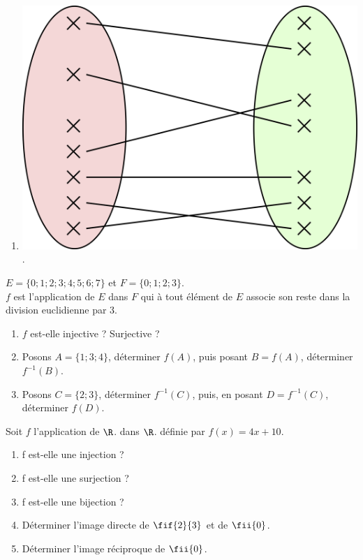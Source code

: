 \documentclass[a4paper,11pt]{article}
\begin{document}
\begin{multicols}{2}
\begin{enumerate}[\bfseries 1.]
		
	\item 	\includegraphics[width=\myw]{8.png}\\
	
				.\dotfill
\end{enumerate}
\end{multicols}

\exo{}


$E=\{0;1;2;3;4;5;6;7\}$ et $F=\{0;1;2;3\}$.\\
$f$ est l'application de $E$ dans $F$ qui à tout élément de $E$ associe son reste dans la division euclidienne par 3.
\begin{enumerate}[\bfseries 1.]
	\item 	$f$ est-elle injective ? Surjective ?
	\item 	Posons $A=\{1;3;4\}$, déterminer $f(A)$, puis posant $B=f(A)$, déterminer $f^{-1}(B)$.
	\item 	Posons $C=\{2;3\}$, déterminer $f^{-1}(C)$, puis, en posant $D=f^{-1}(C)$, déterminer $f(D)$.\\
\end{enumerate}

\exo{}

Soit $f$ l'application de $\R$. dans $\R$. définie par $f(x) = 4x + 10$.
\begin{enumerate}[\bfseries 1.]
	\item 	f est-elle une injection ?
	\item 	f est-elle une surjection ?
	\item 	f est-elle une bijection ?
	\item 	Déterminer l'image directe de $\fif{2}{3}$ et de $\fii{0}$.
	\item 	Déterminer l'image réciproque de $\fii{0}$.\\	
\end{enumerate}
\end{document}
